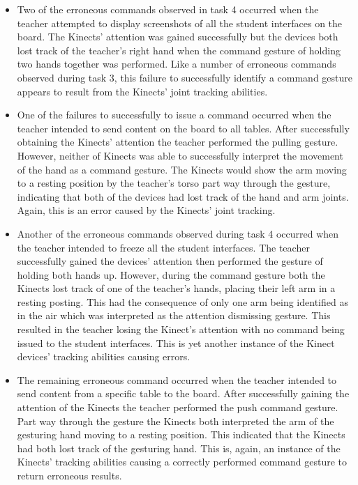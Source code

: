 \documentclass[manuscript, review, screen]{acmart}
\begin{document}
\begin{itemize}
\item Two of the erroneous commands observed in task 4 occurred when the teacher attempted to display screenshots of all the student interfaces on the board.
The Kinects' attention was gained successfully but the devices both lost track of the teacher's right hand when the command gesture of holding two hands together was performed.
Like a number of erroneous commands observed during task 3, this failure to successfully identify a command gesture appears to result from the Kinects' joint tracking abilities.

\item One of the failures to successfully to issue a command occurred when the teacher intended to send content on the board to all tables.
After successfully obtaining the Kinects' attention the teacher performed the pulling gesture.
However, neither of Kinects was able to successfully interpret the movement of the hand as a command gesture.
The Kinects would show the arm moving to a resting position by the teacher's torso part way through the gesture, indicating that both of the devices had lost track of the hand and arm joints.
Again, this is an error caused by the Kinects' joint tracking.

\item Another of the erroneous commands observed during task 4 occurred when the teacher intended to freeze all the student interfaces.
The teacher successfully gained the devices' attention then performed the gesture of holding both hands up.
However, during the command gesture both the Kinects lost track of one of the teacher's hands, placing their left arm in a resting posting.
This had the consequence of only one arm being identified as in the air which was interpreted as the attention dismissing gesture.
This resulted in the teacher losing the Kinect's attention with no command being issued to the student interfaces.
This is yet another instance of the Kinect devices' tracking abilities causing errors.

\item The remaining erroneous command occurred when the teacher intended to send content from a specific table to the board.
After successfully gaining the attention of the Kinects the teacher performed the push command gesture.
Part way through the gesture the Kinects both interpreted the arm of the gesturing hand moving to a resting position.
This indicated that the Kinects had both lost track of the gesturing hand.
This is, again, an instance of the Kinects' tracking abilities causing a correctly performed command gesture to return erroneous results.
\end{itemize}
\end{document}
